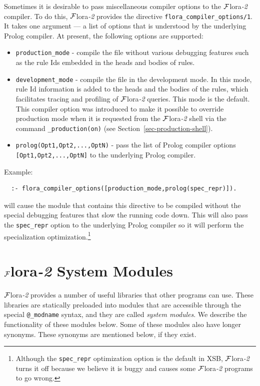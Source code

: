 \documentclass[11pt]{article}
\newcommand{\FLORA}{{\mbox{\sc ${\cal F}${lora}\rm\emph{-2}}}\xspace}
\begin{document}
Sometimes it is desirable to pass miscellaneous 
compiler options to the \FLORA
compiler. To do this, \FLORA provides the directive
{\tt flora\_compiler\_options/1}. It takes one argument --- a list of
options that is understood by the underlying Prolog compiler. At present,
the following options are supported:
\begin{itemize}
\item  \texttt{production\_mode} - compile the file without various
  debugging features such as the rule Ids embedded in the heads and bodies
  of rules.
\item \texttt{development\_mode} - compile the file in the development
  mode. In this mode, rule Id information is added to the heads and the
  bodies of the rules, which facilitates tracing and profiling of \FLORA
  queries. This mode is the default. This compiler option was introduced to
  make it possible to override production mode when it is
  requested from the \FLORA shell via the command
  \texttt{\_production(on)} (see Section~\ref{sec-production-shell}).
\item \texttt{prolog(Opt1,Opt2,...,OptN)} - pass the list of Prolog
  compiler options \texttt{[Opt1,Opt2,...,OptN]} to the underlying Prolog
  compiler.  
\end{itemize}
Example:
\begin{verbatim}
  :- flora_compiler_options([production_mode,prolog(spec_repr)]).  
\end{verbatim}
will cause the module that contains this directive to be compiled without
the special debugging features that slow the running code down. This will
also pass the \texttt{spec\_repr} option to the underlying Prolog compiler
so  it will perform the specialization optimization.\footnote{
  Although the \texttt{spec\_repr} optimization option is the default in
  XSB, \FLORA turns it off because we believe it is buggy and causes some
  \FLORA programs to go wrong.
  }


\section{\FLORA System Modules}\label{sec-service-libs}

\FLORA provides a number of useful libraries that other programs can use.
These libraries are statically preloaded into modules that are accessible
through the special {\tt @\_modname} syntax, and they are called
\emph{system modules}.  We describe the functionality of these modules
below. Some of these modules also have longer synonyms.
These synonyms are mentioned below, if they exist.
\end{document}

